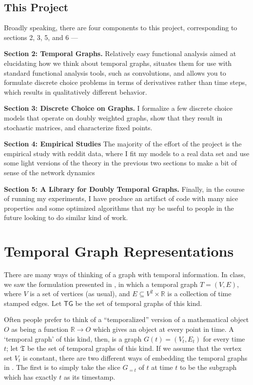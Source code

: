 \documentclass{article}
\theoremstyle{definition}
\begin{document}
	\subsection{This Project}
	Broadly speaking, there are four components to this project, corresponding to sections 2, 3, 5, and 6 ---
	
	\textbf{Section 2: Temporal Graphs.}
	Relatively easy functional analysis aimed at elucidating how we think about temporal graphs, situates them for use with standard functional analysis tools, such as convolutions, and allows you to formulate discrete choice problems in terms of derivatives rather than time steps, which results in qualitatively different behavior.
	
	\textbf{Section 3: Discrete Choice on Graphs.}
	I formalize a few discrete choice models that operate on doubly weighted graphs, show that they result in stochastic matrices, and characterize fixed points.
	
	\textbf{Section 4: Empirical Studies}
	The majority of the effort of the project is the empirical study with reddit data, where I fit my models to a real data set and use some light versions of the theory in the previous two sections to make a bit of sense of the network dynamics
	
	\textbf{Section 5: A Library for Doubly Temporal Graphs.} 
	Finally, in the course of running my experiments, I have produce an artifact of code with many nice properties and some optimized algorithms that my be useful to people in the future looking to do similar kind of work.	
		

	
	\section{Temporal Graph Representations}
	There are many ways of thinking of a graph with temporal information. In class, we saw the formulation presented in \cite{paranjape2017motifs}, in which a temporal graph $T = (V, E)$, where $V$ is a set of vertices (as usual), and $E \subseteq V^2 \times  \mathbb R$ is a collection of time stamped edges. Let $\mathsf{TG}$ be the set of temporal graphs of this kind.
	
	Often people prefer to think of a ``temporalized'' version of a mathematical object $O$ as being a function $\mathbb R \to O$ which gives an object at every point in time. A `temporal graph' of this kind, then, is a graph $G(t) = (V_t, E_t)$ for every time $t$; let $\mathfrak{T}$ be the set of temporal graphs of this kind. If we assume that the vertex set $V_t$ is constant, there are two different ways of embedding the temporal graphs in \cite{paranjape2017motifs}. The first is to simply take the slice $G_{=t}$ of $t$ at time $t$ to be the subgraph which has exactly $t$ as its timestamp.
	
\end{document}
